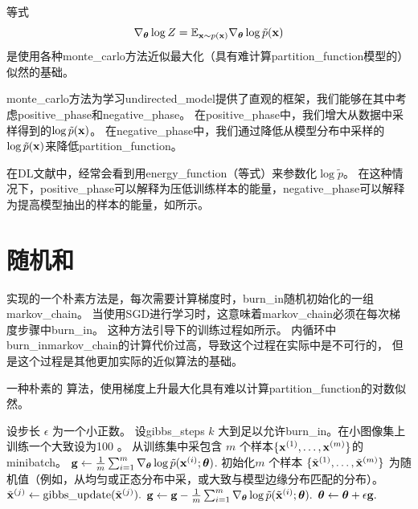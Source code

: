 等式
\begin{equation}
\label{eq:18.15}
	\nabla_{\boldsymbol{\theta}} \log Z = \mathbb{E}_{\mathbf{x} \sim p(\mathbf{x})} \nabla_{\boldsymbol{\theta}} \log \tilde{p}(\mathbf{x})
\end{equation}
是使用各种\gls{monte_carlo}方法近似最大化（具有难计算\gls{partition_function}模型的）似然的基础。

\gls{monte_carlo}方法为学习\gls{undirected_model}提供了直观的框架，我们能够在其中考虑\gls{positive_phase}和\gls{negative_phase}。
在\gls{positive_phase}中，我们增大从数据中采样得到的$\log \tilde{p}(\mathbf{x})$。
在\gls{negative_phase}中，我们通过降低从模型分布中采样的$\log \tilde{p}(\mathbf{x})$来降低\gls{partition_function}。

在\gls{DL}文献中，经常会看到用\gls{energy_function}（等式）来参数化$\log \tilde{p}$。
在这种情况下，\gls{positive_phase}可以解释为压低训练样本的能量，\gls{negative_phase}可以解释为提高模型抽出的样本的能量，如所示。

\section{随机和}
\label{sec:stochastic_maximum_likelihood_and_contrastive_divergence}
实现的一个朴素方法是，每次需要计算梯度时，\gls{burn_in}随机初始化的一组\gls{markov_chain}。
当使用\gls{SGD}进行学习时，这意味着\gls{markov_chain}必须在每次梯度步骤中\gls{burn_in}。
这种方法引导下的训练过程如所示。
内循环中\gls{burn_in}\gls{markov_chain}的计算代价过高，导致这个过程在实际中是不可行的，
但是这个过程是其他更加实际的近似算法的基础。

\begin{algorithm}[ht]
\caption{一种朴素的\,\,算法，使用梯度上升最大化具有难以计算\gls{partition_function}的对数似然。}
\label{alg:naive_cd}
\begin{algorithmic}
\STATE 设步长 $\epsilon$ 为一个小正数。
\STATE 设\gls{gibbs_steps} $k$ 大到足以允许\gls{burn_in}。在小图像集上训练一个大致设为100 。
\STATE 从训练集中采包含 $m$ 个样本$\{ \mathbf{x}^{(1)}, \dots, \mathbf{x}^{(m)}\}$的\gls{minibatch}。
\STATE $\mathbf{g} \leftarrow \frac{1}{m} \sum_{i=1}^m \nabla_{\boldsymbol{\theta}} \log \tilde{p}(\mathbf{x}^{(i)}; \boldsymbol{\theta})$.
\STATE 初始化$m$ 个样本 $\{ \tilde{\mathbf{x}}^{(1)}, \dots, \tilde{\mathbf{x}}^{(m)} \}$ 为随机值（例如，从均匀或正态分布中采，或大致与模型边缘分布匹配的分布）。
        \STATE $\tilde{\mathbf{x}}^{(j)} \leftarrow \text{gibbs\_update}(\tilde{\mathbf{x}}^{(j)}).$
    \ENDFOR
\ENDFOR
\STATE $\mathbf{g} \leftarrow \mathbf{g} - \frac{1}{m} \sum_{i=1}^m \nabla_{\boldsymbol{\theta}} \log \tilde{p}( \tilde{\mathbf{x}}^{(i)} ; \boldsymbol{\theta} ).$
\STATE $\boldsymbol{\theta} \leftarrow \boldsymbol{\theta} + \epsilon \mathbf{g}.$
\ENDWHILE
\end{algorithmic}
\end{algorithm}


